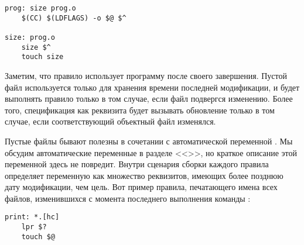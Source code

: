{\footnotesize
\begin{verbatim}
prog: size prog.o
    $(CC) $(LDFLAGS) -o $@ $^

size: prog.o
    size $^
    touch size
\end{verbatim}
}

Заметим, что правило  использует программу
 после своего завершения. Пустой файл используется
только для хранения времени последней модификации, и \GNUmake{} будет
выполнять правило  только в том случае, если файл
 подвергся изменению. Более того, спецификация
 как реквизита  будет вызывать обновление
 только в том случае, если соответствующий объектный файл
изменялся.

Пустые файлы бывают полезны в сочетании с автоматической переменной
. Мы обсудим автоматические переменные в разделе
<<>>, но краткое описание этой переменной
здесь не повредит. Внутри сценария сборки каждого правила \GNUmake{}
определяет переменную  как множество реквизитов, имеющих
более позднюю дату модификации, чем цель.  Вот пример правила,
печатающего имена всех файлов, изменившихся с момента последнего
выполнения команды :

{\footnotesize
\begin{verbatim}
print: *.[hc]
    lpr $?
    touch $@
\end{verbatim}
}
